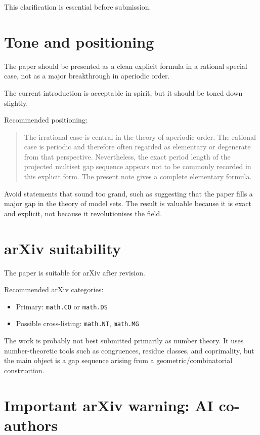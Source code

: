 \documentclass[11pt]{article}
\begin{document}
This clarification is essential before submission.

\section*{Tone and positioning}

The paper should be presented as a clean explicit formula in a rational
special case, not as a major breakthrough in aperiodic order.

The current introduction is acceptable in spirit, but it should be toned down
slightly.

Recommended positioning:

\begin{quote}
The irrational case is central in the theory of aperiodic order.  The
rational case is periodic and therefore often regarded as elementary or
degenerate from that perspective.  Nevertheless, the exact period length of
the projected multiset gap sequence appears not to be commonly recorded in
this explicit form.  The present note gives a complete elementary formula.
\end{quote}

Avoid statements that sound too grand, such as suggesting that the paper
fills a major gap in the theory of model sets.  The result is valuable
because it is exact and explicit, not because it revolutionises the field.

\section*{arXiv suitability}

The paper is suitable for arXiv after revision.

Recommended arXiv categories:

\begin{itemize}
    \item Primary: \texttt{math.CO} or \texttt{math.DS}
    \item Possible cross-listing: \texttt{math.NT}, \texttt{math.MG}
\end{itemize}

The work is probably not best submitted primarily as number theory.  It uses
number-theoretic tools such as congruences, residue classes, and coprimality,
but the main object is a gap sequence arising from a geometric/combinatorial
construction.

\section*{Important arXiv warning: AI co-authors}
\end{document}
